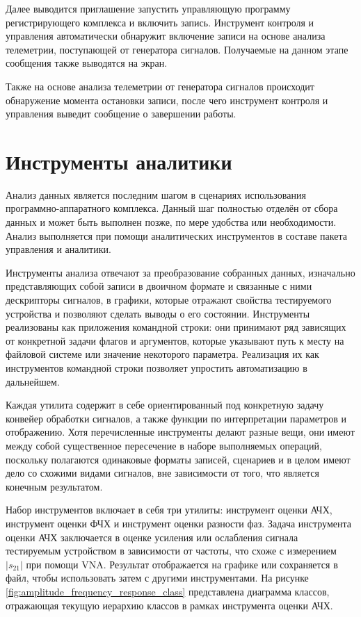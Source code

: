 \documentclass{report}
\begin{document}
Далее выводится приглашение запустить управляющую программу регистрирующего комплекса и включить запись. Инструмент контроля и управления автоматически обнаружит включение записи на основе анализа телеметрии, поступающей от генератора сигналов. Получаемые на данном этапе сообщения также выводятся на экран.

Также на основе анализа телеметрии от генератора сигналов происходит обнаружение момента остановки записи, после чего инструмент контроля и управления выведит сообщение о завершении работы.

\section{Инструменты аналитики}

Анализ данных является последним шагом в сценариях использования программно-аппаратного комплекса. Данный шаг полностью отделён от сбора данных и может быть выполнен позже, по мере удобства или необходимости. Анализ выполняется при помощи аналитических инструментов в составе пакета управления и аналитики.

Инструменты анализа отвечают за преобразование собранных данных, изначально представляющих собой записи в двоичном формате и связанные с ними дескрипторы сигналов, в графики, которые отражают свойства тестируемого устройства и позволяют сделать выводы о его состоянии. Инструменты реализованы как приложения командной строки: они принимают ряд зависящих от конкретной задачи флагов и аргументов, которые указывают путь к месту на файловой системе или значение некоторого параметра. Реализация их как инструментов командной строки позволяет упростить автоматизацию в дальнейшем.

Каждая утилита содержит в себе ориентированный под конкретную задачу конвейер обработки сигналов, а также функции по интерпретации параметров и отображению. Хотя перечисленные инструменты делают разные вещи, они имеют между собой существенное пересечение в наборе выполняемых операций, поскольку полагаются одинаковые форматы записей, сценариев и в целом имеют дело со схожими видами сигналов, вне зависимости от того, что является конечным результатом.

Набор инструментов включает в себя три утилиты: инструмент оценки АЧХ, инструмент оценки ФЧХ и инструмент оценки разности фаз. Задача инструмента оценки АЧХ заключается в оценке усиления или ослабления сигнала тестируемым устройством в зависимости от частоты, что схоже с измерением $|s_{21}|$ при помощи VNA. Результат отображается на графике или сохраняется в файл, чтобы использовать затем с другими инструментами. На рисунке \ref{fig:amplitude_frequency_response_class} представлена диаграмма классов, отражающая текущую иерархию классов в рамках инструмента оценки АЧХ.
\end{document}
